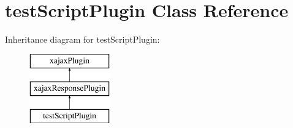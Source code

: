 \hypertarget{classtestScriptPlugin}{
\section{testScriptPlugin Class Reference}
\label{classtestScriptPlugin}
}
Inheritance diagram for testScriptPlugin:\begin{figure}[H]
\begin{center}
\leavevmode
\includegraphics[height=3.000000cm]{classtestScriptPlugin}
\end{center}
\end{figure}
